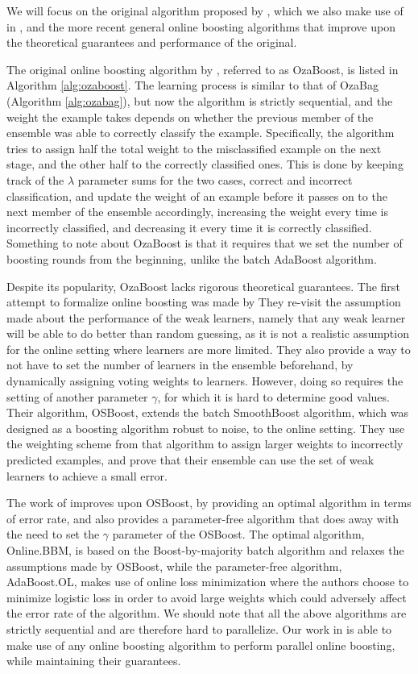 We will focus on the original algorithm proposed by \citeauthor{Oza2001online},
which we also make use of in \boostvht,
and the more recent general online boosting algorithms that improve upon the
theoretical guarantees and performance of the original.

The original online boosting algorithm by \citeauthor{Oza2001online}, referred to as
OzaBoost, is listed
in Algorithm \ref{alg:ozaboost}.
The learning process is similar to that of OzaBag (Algorithm \ref{alg:ozabag}), but now the
algorithm is strictly sequential, and the weight the example takes depends on whether
the previous member of the ensemble was able to correctly classify the example.
Specifically, the algorithm tries to assign half the total weight to the misclassified
example on the next stage, and the other half to the correctly classified ones.
This is done by keeping track of the $\lambda$ parameter sums for the two cases,
correct and incorrect classification, and update the weight of an example
before it passes on to the next member of the ensemble accordingly, increasing
the weight every time is incorrectly classified, and decreasing it every time it
is correctly classified.  Something to note about OzaBoost is that it requires
that we set the number of boosting rounds from the beginning, unlike the
batch AdaBoost algorithm.

Despite its popularity, OzaBoost lacks rigorous theoretical guarantees.
The first attempt to formalize online boosting was made by \citet{online-boosting-theoretical}
They re-visit the assumption made about the performance of the weak
learners, namely that any weak learner will be able to
do better than random guessing, as it is not a realistic assumption
for the online setting where learners are more limited. They also
provide a way to not have to set the number of learners in the ensemble beforehand,
by dynamically assigning voting weights to learners.
However, doing so requires the setting of another parameter $\gamma$,
for which it is hard to determine good values.
Their algorithm, OSBoost,
extends the batch SmoothBoost \cite{smoothboost} algorithm, which
was designed as a boosting algorithm robust to noise, to the online
setting. They use the weighting scheme from that algorithm to assign
larger weights to incorrectly predicted examples, and prove that
their ensemble can use the set of weak learners to achieve a small
error.

The work of \citet{Beygelzimer2015optimal} improves upon OSBoost,
by providing an optimal algorithm in terms of error rate, and also provides
a parameter-free algorithm that does away with the need to set the $\gamma$
parameter of the OSBoost.
The optimal algorithm, Online.BBM, is based on the Boost-by-majority batch
algorithm \cite{batch-bbm} and relaxes the assumptions made by OSBoost,
while the parameter-free algorithm, AdaBoost.OL, makes use of online
loss minimization where the authors choose to minimize logistic loss
in order to avoid large weights which could adversely affect the
error rate of the algorithm.
We should note that all the above algorithms are strictly sequential
and are therefore hard to parallelize.
Our work in \boostvht is able to
make use of any online boosting algorithm to perform
parallel online boosting, while maintaining their guarantees.


